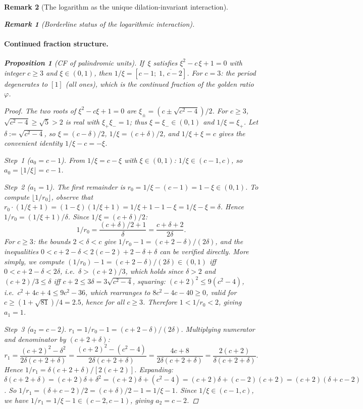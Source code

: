 \documentclass[12pt, a4paper]{article}
\newtheorem{proposition}[theorem]{Proposition}
\newtheorem{remark}{Remark}[section]
\numberwithin{equation}{section}
\begin{document}
\begin{remark}[The logarithm as the unique dilation-invariant interaction]
\begin{remark}[Borderline status of the logarithmic interaction]
\paragraph{Continued fraction structure.}
\begin{proposition}[CF of palindromic units]\label{prop:cf-palindromic}
If\, $\xi$ satisfies $\xi^2 - c\,\xi + 1 = 0$ with integer
$c \ge 3$ and $\xi \in (0,1)$, then
$1/\xi = [c{-}1;\;\overline{1,\, c{-}2}]$.
For $c = 3$: the period degenerates to $[1]$ (all ones), which
is the continued fraction of the golden ratio~$\varphi$.
\end{proposition}

\begin{proof}
The two roots of $\xi^2 - c\xi + 1 = 0$ are
$\xi_\pm = (c \pm \sqrt{c^2{-}4})/2$.  For $c \ge 3$,
$\sqrt{c^2{-}4} \ge \sqrt{5} > 2$ is real with $\xi_+\xi_- = 1$;
thus $\xi = \xi_- \in (0, 1)$ and $1/\xi = \xi_+$.  Let
$\delta := \sqrt{c^2{-}4}$, so $\xi = (c{-}\delta)/2$,
$1/\xi = (c{+}\delta)/2$, and $1/\xi + \xi = c$ gives
the convenient identity $1/\xi - c = -\xi$.

\emph{Step~1 ($a_0 = c - 1$).}
From $1/\xi = c - \xi$ with $\xi \in (0,1)$:
$1/\xi \in (c{-}1, c)$, so $a_0 = \lfloor 1/\xi \rfloor = c - 1$.

\emph{Step~2 ($a_1 = 1$).}
The first remainder is
$r_0 = 1/\xi - (c{-}1) = 1 - \xi \in (0, 1)$.
To compute $\lfloor 1/r_0 \rfloor$, observe that
$r_0 \cdot (1/\xi + 1) = (1 - \xi)(1/\xi + 1) = 1/\xi + 1 - 1 - \xi
= 1/\xi - \xi = \delta$.
Hence $1/r_0 = (1/\xi + 1)/\delta$.
Since $1/\xi = (c{+}\delta)/2$:
\[
  1/r_0 = \frac{(c+\delta)/2 + 1}{\delta} = \frac{c+\delta+2}{2\delta}.
\]
For $c \ge 3$: the bounds $2 < \delta < c$ give
$1/r_0 - 1 = (c + 2 - \delta)/(2\delta)$, and the inequalities
$0 < c + 2 - \delta < 2(c{-}2) + 2 - \delta + \delta$ can be
verified directly.  More simply, we compute
$(1/r_0) - 1 = (c + 2 - \delta)/(2\delta) \in (0, 1)$ iff
$0 < c + 2 - \delta < 2\delta$, i.e.\ $\delta > (c+2)/3$, which
holds since $\delta > 2$ and $(c+2)/3 \le \delta$ iff
$c + 2 \le 3\delta = 3\sqrt{c^2{-}4}$, squaring:
$(c+2)^2 \le 9(c^2{-}4)$, i.e.\ $c^2 + 4c + 4 \le 9c^2 - 36$,
which rearranges to $8c^2 - 4c - 40 \ge 0$, valid for
$c \ge (1 + \sqrt{81})/4 = 2.5$, hence for all $c \ge 3$.
Therefore $1 < 1/r_0 < 2$, giving $a_1 = 1$.

\emph{Step~3 ($a_2 = c - 2$).}
$r_1 = 1/r_0 - 1 = (c + 2 - \delta)/(2\delta)$.  Multiplying
numerator and denominator by $(c + 2 + \delta)$:
\[
  r_1 = \frac{(c+2)^2 - \delta^2}{2\delta(c + 2 + \delta)}
  = \frac{(c+2)^2 - (c^2{-}4)}{2\delta(c + 2 + \delta)}
  = \frac{4c + 8}{2\delta(c + 2 + \delta)}
  = \frac{2(c+2)}{\delta(c + 2 + \delta)}.
\]
Hence $1/r_1 = \delta(c + 2 + \delta)/[2(c+2)]$.
Expanding: $\delta(c+2+\delta) = (c+2)\delta + \delta^2
= (c+2)\delta + (c^2 - 4) = (c+2)\delta + (c{-}2)(c{+}2)
= (c+2)(\delta + c{-}2)$.  So
$1/r_1 = (\delta + c - 2)/2 = (c + \delta)/2 - 1 = 1/\xi - 1$.
Since $1/\xi \in (c{-}1, c)$, we have
$1/r_1 = 1/\xi - 1 \in (c{-}2, c{-}1)$, giving $a_2 = c - 2$.


\end{proof}
\end{remark}
\end{remark}
\end{document}
